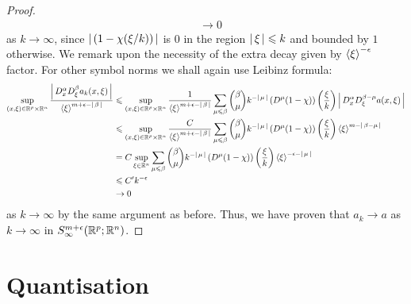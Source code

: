 \documentclass{article}
\begin{document}
\begin{proof}
\begin{align*}
    & \to 0
    \end{align*}
    as $k \to \infty$, since $\abs{( 1- \chi(\xi/ k))}$ is 0 in the region $\abs{\xi} \leq k$ and bounded by $1$ otherwise.  We remark upon the necessity of the extra decay given by $\sym[\xi]^{-\epsilon}$ factor. For other symbol norms we shall again use Leibinz formula: 
    \begin{align*}
    \sup_{(x, \xi) \in \R^p \times \R^n} \frac{\abs{D^\alpha_x D^\beta_\xi a_k(x, \xi)}}{\sym[\xi]^{m + \epsilon - \abs{\beta}}} 
    & \leq \sup_{(x, \xi) \in \R^p \times \R^n} \frac{1}{\sym[\xi]^{m + \epsilon - \abs{\beta}}} \sum_{\mu \leq \beta} \binom{\beta}{\mu}k^{-\abs{\mu}} \brac{D^\mu (1 - \chi)}\brac{\frac{\xi}{k}} \abs{D^\alpha_x D^{\beta - \mu}_\xi a(x, \xi) } \\
    & \leq  \sup_{(x, \xi) \in \R^p \times \R^n} \frac{C}{\sym[\xi]^{m + \epsilon - \abs{\beta}}} \sum_{\mu \leq \beta} \binom{\beta}{\mu}k^{-\abs{\mu}} \brac{D^\mu (1 - \chi)}\brac{\frac{\xi}{k}} \sym[\xi]^{m - \abs{\beta - \mu}}  \\
    & = C \sup_{\xi \in \R^n} \sum_{\mu \leq \beta} \binom{\beta}{\mu}k^{-\abs{\mu}} \brac{D^\mu (1 - \chi)}\brac{\frac{\xi}{k}} \sym[\xi]^{- \epsilon - \abs{\mu}}  \\
    & \leq C' k^{- \epsilon} \\
    & \to 0
    \end{align*}
    as $k \to \infty$ by the same argument as before. Thus, we have proven that $a_k \to a$ as $k \to \infty$ in $S^{m + \epsilon}_\infty(\R^p; \R^n)$. 
    
\end{proof}


\pagebreak
\section{Quantisation}
\end{document}
